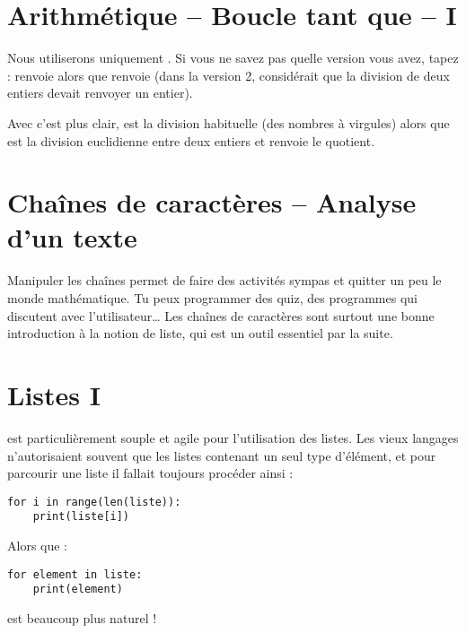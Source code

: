 \documentclass[11pt,class=report,crop=false]{standalone}
\begin{document}
\section{Arithmétique -- Boucle tant que -- I}

Nous utiliserons uniquement . Si vous ne savez pas quelle version vous avez, tapez
 :  renvoie  alors que  renvoie  (dans la version 2, \Python{} considérait que la division de deux entiers devait renvoyer un entier).

Avec  c'est plus clair,  est la division habituelle (des nombres à virgules) alors que  est la division euclidienne entre deux entiers et renvoie le quotient.


\section{Chaînes de caractères -- Analyse d’un texte}

Manipuler les chaînes permet de faire des activités sympas et quitter un peu le monde  mathématique. Tu peux programmer des quiz, des programmes qui discutent avec l'utilisateur\ldots{}
Les chaînes de caractères sont surtout une bonne introduction à la notion de liste, qui est un outil essentiel par la suite.



\section{Listes I}

\Python{} est particulièrement souple et agile pour l'utilisation des listes.
Les \og{}vieux\fg{} langages n'autorisaient souvent que les listes contenant un seul type d'élément, et pour parcourir une liste il fallait toujours procéder ainsi :
\begin{lstlisting}
for i in range(len(liste)):
    print(liste[i])
\end{lstlisting}  
Alors que :
\begin{lstlisting}
for element in liste:
    print(element)
\end{lstlisting} 
est beaucoup plus naturel !
\end{document}
